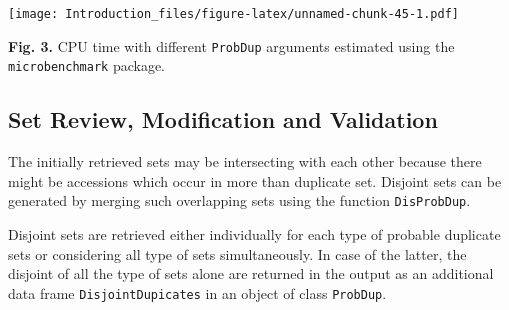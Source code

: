 \documentclass[
]{article}
\newenvironment{Shaded}{\begin{snugshade}}{\end{snugshade}}
\newcommand{\CharTok}[1]{\textcolor[rgb]{0.31,0.60,0.02}{#1}}
\newcommand{\DataTypeTok}[1]{\textcolor[rgb]{0.13,0.29,0.53}{#1}}
\newcommand{\FloatTok}[1]{\textcolor[rgb]{0.00,0.00,0.81}{#1}}
\newcommand{\KeywordTok}[1]{\textcolor[rgb]{0.13,0.29,0.53}{\textbf{#1}}}
\newcommand{\NormalTok}[1]{#1}
\newcommand{\StringTok}[1]{\textcolor[rgb]{0.31,0.60,0.02}{#1}}
\begin{document}
\begin{Shaded}
\end{Shaded}

\texttt{[image: Introduction\_files/figure-latex/unnamed-chunk-45-1.pdf]}

\textbf{Fig. 3.} CPU time with different \texttt{ProbDup} arguments
estimated using the \texttt{microbenchmark} package.

\hypertarget{set-review-modification-and-validation}{%
\subsection{Set Review, Modification and
Validation}\label{set-review-modification-and-validation}}

The initially retrieved sets may be intersecting with each other because
there might be accessions which occur in more than duplicate set.
Disjoint sets can be generated by merging such overlapping sets using
the function \texttt{DisProbDup}.

Disjoint sets are retrieved either individually for each type of
probable duplicate sets or considering all type of sets simultaneously.
In case of the latter, the disjoint of all the type of sets alone are
returned in the output as an additional data frame
\texttt{DisjointDupicates} in an object of class \texttt{ProbDup}.
\end{document}
